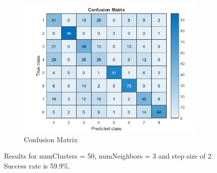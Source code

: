 \begin{figure}[h]
\begin{subfigure}{0.3\textwidth}
	\end{subfigure}
	\begin{subfigure}{0.65\textwidth}
		\includegraphics[width=\textwidth]{figures/confusion_50C_3NN_2S.png}
		\caption{Confusion Matrix}
	\end{subfigure}
	\caption{Results for numClusters = 50, numNeighbors = 3 and step size of 2. Success rate is 59.9\%.}
	\label{fig:a5:50c3nn2s}
\end{figure}

